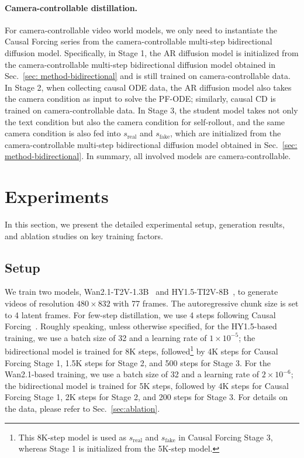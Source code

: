 \documentclass{llmxive}
\begin{document}
\paragraph{Camera-controllable distillation.} For camera-controllable video world models, we only need to instantiate the Causal Forcing series from the camera-controllable multi-step bidirectional diffusion model. Specifically, in Stage 1, the AR diffusion model is initialized from the camera-controllable multi-step bidirectional diffusion model obtained in Sec.~\ref{sec: method-bidirectional} and is still trained on camera-controllable data. In Stage 2, when collecting causal ODE data, the AR diffusion model also takes the camera condition as input to solve the PF-ODE; similarly, causal CD is trained on camera-controllable data. In Stage 3, the student model takes not only the text condition but also the camera condition for self-rollout, and the same camera condition is also fed into $s_\text{real}$ and $s_\text{fake}$, which are initialized from the camera-controllable multi-step bidirectional diffusion model obtained in Sec.~\ref{sec: method-bidirectional}. In summary, all involved models are camera-controllable.
\section{Experiments}
\label{sec:exp}

In this section, we present the detailed experimental setup, generation results, and ablation studies on key training factors.

\subsection{Setup}

We train two models, Wan2.1-T2V-1.3B~\cite{wan2025wan} and HY1.5-TI2V-8B~\cite{kong2024hunyuanvideo}, to generate videos of resolution $480\times 832$ with 77 frames. The autoregressive chunk size is set to 4 latent frames. For few-step distillation, we use 4 steps following Causal Forcing~\cite{zhu2026causal}. Roughly speaking, unless otherwise specified, for the HY1.5-based training, we use a batch size of 32 and a learning rate of $1\times 10^{-5}$; the bidirectional model is trained for 8K steps, followed\footnote{This 8K-step model is used as $s_{\text{real}}$ and $s_{\text{fake}}$ in Causal Forcing Stage 3, whereas Stage 1 is initialized from the 5K-step model.} by 4K steps for Causal Forcing Stage 1, 1.5K steps for Stage 2, and 500 steps for Stage 3. For the Wan2.1-based training, we use a batch size of 32 and a learning rate of $2\times 10^{-6}$; the bidirectional model is trained for 5K steps, followed by 4K steps for Causal Forcing Stage 1, 2K steps for Stage 2, and 200 steps for Stage 3. For details on the data, please refer to Sec.~\ref{sec:ablation}.
\end{document}
